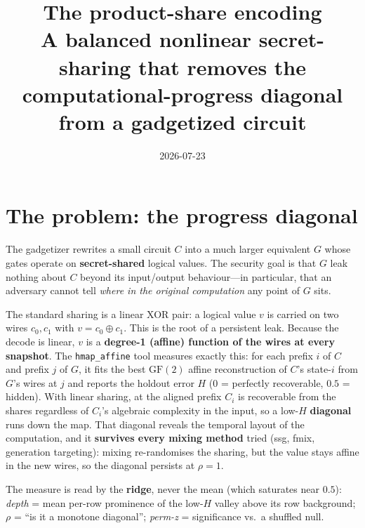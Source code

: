\documentclass[11pt]{article}
\title{\textbf{The product-share encoding}\\[2pt]
\large A balanced nonlinear secret-sharing that removes the computational-progress
diagonal from a gadgetized circuit}
\author{}
\date{2026-07-23}
\newcommand{\xor}{\oplus}
\begin{document}
\maketitle

\begin{center}\end{center}


\section{The problem: the progress diagonal}

The gadgetizer rewrites a small circuit $C$ into a much larger equivalent $G$
whose gates operate on \textbf{secret-shared} logical values. The security goal
is that $G$ leak nothing about $C$ beyond its input/output behaviour---in
particular, that an adversary cannot tell \emph{where in the original
computation} any point of $G$ sits.

The standard sharing is a linear XOR pair: a logical value $v$ is carried on two
wires $c_0,c_1$ with $v=c_0\xor c_1$. This is the root of a persistent leak.
Because the decode is linear, $v$ is a \textbf{degree-1 (affine) function of the
wires at every snapshot}. The \texttt{hmap\_affine} tool measures exactly this:
for each prefix $i$ of $C$ and prefix $j$ of $G$, it fits the best $\mathrm{GF}(2)$
affine reconstruction of $C$'s state-$i$ from $G$'s wires at $j$ and reports the
holdout error $H$ ($0$ = perfectly recoverable, $0.5$ = hidden). With linear
sharing, at the aligned prefix $C_i$ is recoverable from the shares regardless of
$C_i$'s algebraic complexity in the input, so a low-$H$ \textbf{diagonal} runs
down the map. That diagonal reveals the temporal layout of the computation, and
it \textbf{survives every mixing method} tried (ssg, fmix, generation
targeting): mixing re-randomises the sharing, but the value stays affine in the
new wires, so the diagonal persists at $\rho=1$.

The measure is read by the \textbf{ridge}, never the mean (which saturates near
$0.5$): \emph{depth} = mean per-row prominence of the low-$H$ valley above its
row background; $\rho$ = ``is it a monotone diagonal''; \emph{perm-z} =
significance vs.\ a shuffled null.
\end{document}
